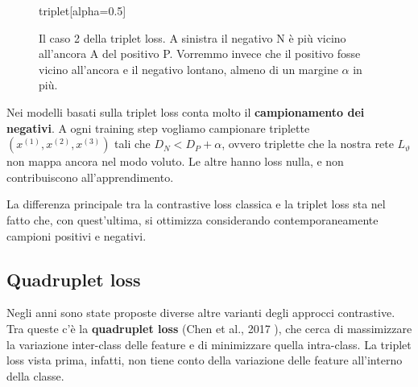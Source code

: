 \begin{figure}[htbp]
\centering
\begin{widget}{triplet}[alpha=0.5]
\end{widget}
\caption{Il caso 2 della triplet loss. A sinistra il negativo N è più vicino all'ancora A del positivo P. Vorremmo invece che il positivo fosse vicino all'ancora e il negativo lontano, almeno di un margine $\alpha$ in più.}
\label{fig:triplet}
\end{figure}

Nei modelli basati sulla triplet loss conta molto il \textbf{campionamento dei negativi}. A ogni training step vogliamo campionare triplette $(x^{(1)}, x^{(2)}, x^{(3)})$ tali che $D_N < D_P + \alpha$, ovvero triplette che la nostra rete $L_\vartheta$ non mappa ancora nel modo voluto. Le altre hanno loss nulla, e non contribuiscono all'apprendimento.

La differenza principale tra la contrastive loss classica e la triplet loss sta nel fatto che, con quest'ultima, si ottimizza considerando contemporaneamente campioni positivi e negativi.

\subsection{Quadruplet loss}
Negli anni sono state proposte diverse altre varianti degli approcci contrastive. Tra queste c'è la \textbf{quadruplet loss} (Chen et al., 2017 \cite{Chen2017}), che cerca di massimizzare la variazione inter-class delle feature e di minimizzare quella intra-class. La triplet loss vista prima, infatti, non tiene conto della variazione delle feature all'interno della classe.

